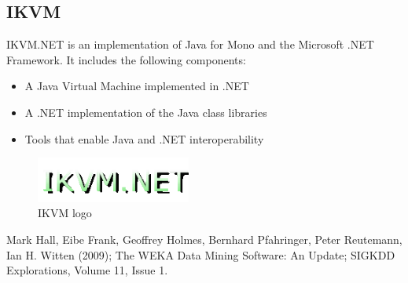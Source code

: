 \documentclass[journal]{IEEEtran/IEEEtran}
\newcommand\subsect[1]{\subsection{#1}\noindent}
\begin{document}
\subsect{IKVM}IKVM.NET is an implementation of Java for Mono and the Microsoft .NET Framework. It includes the following components:
\begin{itemize}
\item A Java Virtual Machine implemented in .NET
\item A .NET implementation of the Java class libraries
\item Tools that enable Java and .NET interoperability
\end{itemize}
\begin{figure}[H]
\centering
\includegraphics[width=2in]{IKVM}
\caption{IKVM logo}
\label{fig_sim}
\end{figure}





%
%
%
\begin{thebibliography}{1}

Mark Hall, Eibe Frank, Geoffrey Holmes, Bernhard Pfahringer, Peter Reutemann, Ian H. Witten (2009); The WEKA Data Mining Software: An Update; SIGKDD Explorations, Volume 11, Issue 1.


\end{thebibliography}
\end{document}
